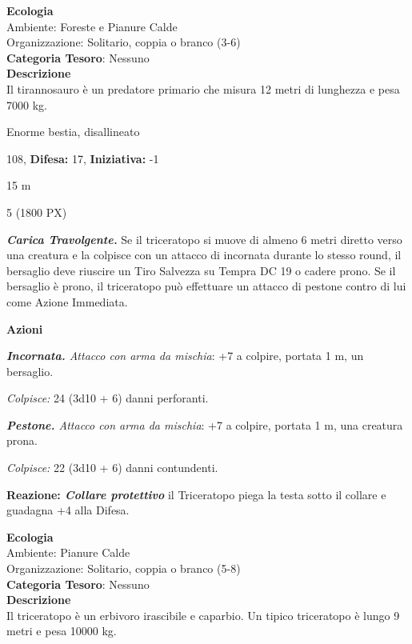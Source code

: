\begin{multicols}{2}
{\textbf{Ecologia}\\
Ambiente: Foreste e Pianure Calde\\
Organizzazione: Solitario, coppia o branco (3-6)\\
\textbf{Categoria Tesoro}: Nessuno\\
\textbf{Descrizione}\\
Il tirannosauro è un predatore primario che misura 12 metri di lunghezza e pesa 7000 kg.

\noindent
\begin{description}[noitemsep, topsep=0pt, parsep=0pt, partopsep=0pt, leftmargin=0cm, labelwidth=2.2cm]
	\item[\textbf{Taglia/Tipo:}] Enorme bestia, disallineato
	\item[\textbf{Caratt.:}] 
	\item[\textbf{Punti Ferita:}] 108,  \textbf{Difesa:} 17,  \textbf{Iniziativa:} -1
	\item[\textbf{Movimento:}] 15 m
	\item[\textbf{Tiri Salvez.:}] 
	\item[\textbf{Sfida:}] 5 (1800 PX)\smallskip
\end{description}

\emph{\textbf{Carica Travolgente.}} Se il triceratopo si muove di almeno 6 metri diretto verso una creatura e la colpisce con un attacco di incornata durante lo stesso round, il bersaglio deve riuscire un Tiro Salvezza su Tempra DC 19 o cadere prono. Se il bersaglio è prono, il triceratopo può effettuare un attacco di pestone contro di lui come Azione Immediata.

\textbf{Azioni}

\emph{\textbf{Incornata.} Attacco con arma da mischia}: +7 a colpire, portata 1 m, un bersaglio.

\emph{Colpisce:} 24 (3d10 + 6) danni perforanti.

\emph{\textbf{Pestone.} Attacco con arma da mischia}: +7 a colpire, portata 1 m, una creatura prona.

\emph{Colpisce:} 22 (3d10 + 6) danni contundenti.

\textbf{Reazione: \emph{Collare protettivo}} il Triceratopo piega la testa sotto il collare e guadagna +4 alla Difesa.

\textbf{Ecologia}\\
Ambiente: Pianure Calde\\
Organizzazione: Solitario, coppia o branco (5-8)\\
\textbf{Categoria Tesoro}: Nessuno\\
\textbf{Descrizione}\\
Il triceratopo è un erbivoro irascibile e caparbio. Un tipico triceratopo è lungo 9 metri e pesa 10000 kg.

}
\end{multicols}
